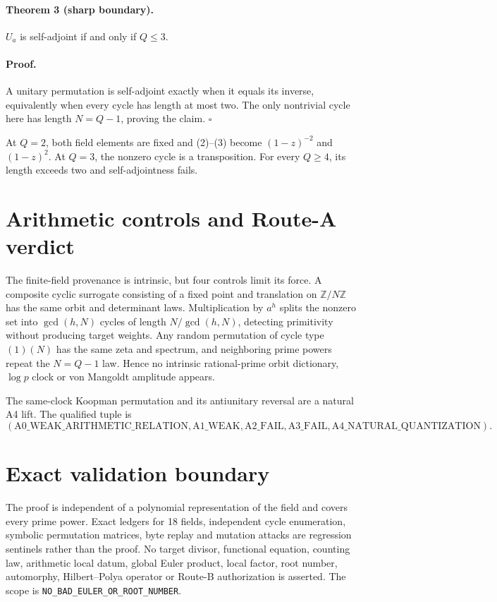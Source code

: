 \documentclass[10pt]{article}
\begin{document}
\paragraph{Theorem 3 (sharp boundary).}
$U_a$ is self-adjoint if and only if $Q\leq3$.

\paragraph{Proof.}
A unitary permutation is self-adjoint exactly when it equals its inverse,
equivalently when every cycle has length at most two.  The only nontrivial
cycle here has length $N=Q-1$, proving the claim. \hfill$\square$

At $Q=2$, both field elements are fixed and (2)--(3) become
$(1-z)^{-2}$ and $(1-z)^2$.  At $Q=3$, the nonzero cycle is a transposition.
For every $Q\geq4$, its length exceeds two and self-adjointness fails.

\section{Arithmetic controls and Route-A verdict}
The finite-field provenance is intrinsic, but four controls limit its force.
A composite cyclic surrogate consisting of a fixed point and translation on
$\mathbb Z/N\mathbb Z$ has the same orbit and determinant laws.  Multiplication
by $a^h$ splits the nonzero set into $\gcd(h,N)$ cycles of length
$N/\gcd(h,N)$, detecting primitivity without producing target weights.  Any
random permutation of cycle type $(1)(N)$ has the same zeta and spectrum, and
neighboring prime powers repeat the $N=Q-1$ law.  Hence no intrinsic
rational-prime orbit dictionary, $\log p$ clock or von Mangoldt amplitude
appears.

The same-clock Koopman permutation and its antiunitary reversal are a natural
A4 lift.  The qualified tuple is
\[
 (\mathrm{A0\_WEAK\_ARITHMETIC\_RELATION},\mathrm{A1\_WEAK},
 \mathrm{A2\_FAIL},\mathrm{A3\_FAIL},
 \mathrm{A4\_NATURAL\_QUANTIZATION}).                           \tag{5}
\]

\section{Exact validation boundary}
The proof is independent of a polynomial representation of the field and
covers every prime power.  Exact ledgers for 18 fields, independent cycle
enumeration, symbolic permutation matrices, byte replay and mutation attacks
are regression sentinels rather than the proof.  No target divisor, functional
equation, counting law, arithmetic local datum, global Euler product, local
factor, root number, automorphy, Hilbert--Polya operator or Route-B
authorization is asserted.  The scope is
\texttt{NO\_BAD\_EULER\_OR\_ROOT\_NUMBER}.
\end{document}
